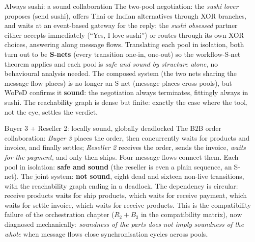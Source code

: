 \begin{examplebox}{Always sushi: a sound collaboration}
The two-pool negotiation: the \emph{sushi lover} proposes (\textsf{send sushi}), offers Thai or Indian alternatives through XOR branches, and waits at an event-based gateway for the reply; the \emph{sushi obsessed} partner either accepts immediately (``Yes, I love sushi'') or routes through its own XOR choices, answering along message flows. Translating each pool in isolation, both turn out to be \textbf{S-nets} (every transition one-in, one-out) so the workflow-S-net theorem applies and each pool is \emph{safe and sound by structure alone}, no behavioural analysis needed. The composed system (the two nets sharing the message-flow places) is no longer an S-net (message places cross pools), but WoPeD confirms it \textbf{sound}: the negotiation always terminates, fittingly always in sushi. The reachability graph is dense but finite: exactly the case where the tool, not the eye, settles the verdict.
\end{examplebox}

\begin{examplebox}{Buyer 3 + Reseller 2: locally sound, globally deadlocked}
The B2B order collaboration: \emph{Buyer 3} places the order, then concurrently waits for products and invoice, and finally settles; \emph{Reseller 2} receives the order, sends the invoice, \emph{waits for the payment}, and only then ships. Four message flows connect them. Each pool in isolation: \textbf{safe and sound} (the reseller is even a plain sequence, an S-net). The joint system: \textbf{not sound}, eight dead and sixteen non-live transitions, with the reachability graph ending in a deadlock. The dependency is circular: \textsf{receive products} waits for \textsf{ship products}, which waits for \textsf{receive payment}, which waits for \textsf{settle invoice}, which waits for \textsf{receive products}. This is the compatibility failure of the orchestration chapter ($R_2 + B_3$ in the compatibility matrix), now diagnosed mechanically: \emph{soundness of the parts does not imply soundness of the whole} when message flows close synchronisation cycles across pools.
\end{examplebox}
